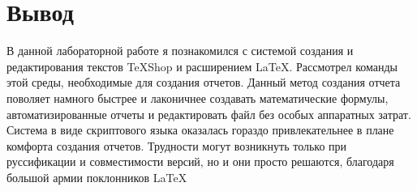 \documentclass[10pt,a4paper]{report}
\begin{document}
\pagebreak

\chapter{Вывод}
В данной лабораторной работе я познакомился  с системой создания и редактирования текстов TeXShop и расширением \LaTeX. Рассмотрел команды этой среды, необходимые для создания отчетов.
Данный метод создания отчета поволяет намного быстрее и лаконичнее создавать математические формулы, автоматизированные отчеты и редактировать файл без особых аппаратных затрат.
Система в виде скриптового языка оказалась гораздо привлекательнее в плане комфорта создания отчетов. Трудности могут возникнуть только при руссификации и совместимости версий, но и они просто решаются, благодаря большой армии поклонников \LaTeX
\end{document}
